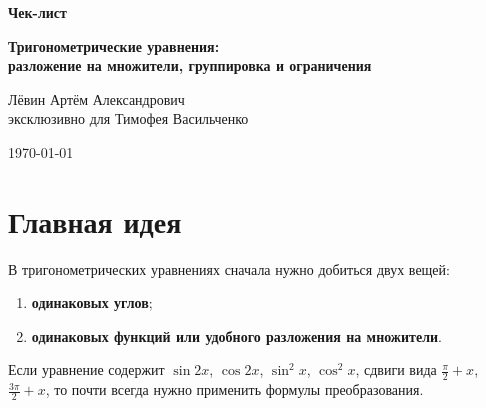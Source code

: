 \documentclass[a4paper,12pt]{article}
\newcommand{\important}[1]{\textcolor{darkaccent}{\textbf{#1}}}
\begin{document}
\begin{titlepage}
\thispagestyle{empty}
\begin{center}
\vspace*{22mm}

{\Huge\bfseries\color{darkaccent} Чек-лист}

\vspace{7mm}

{\Large\bfseries
Тригонометрические уравнения:\\
разложение на множители, группировка и ограничения
}

\vspace{18mm}

{\large
Лёвин Артём Александрович\\
эксклюзивно для Тимофея Васильченко
}

\vspace{8mm}

{\large \today}

\vfill


\vspace{12mm}
\end{center}
\end{titlepage}

\section{Главная идея}

В тригонометрических уравнениях сначала нужно добиться двух вещей:

\begin{enumerate}
  \item \important{одинаковых углов};
  \item \important{одинаковых функций или удобного разложения на множители}.
\end{enumerate}

Если уравнение содержит $\sin 2x$, $\cos 2x$, $\sin^2x$, $\cos^2x$, сдвиги вида $\frac{\pi}{2}+x$, $\frac{3\pi}{2}+x$, то почти всегда нужно применить формулы преобразования.
\end{document}
